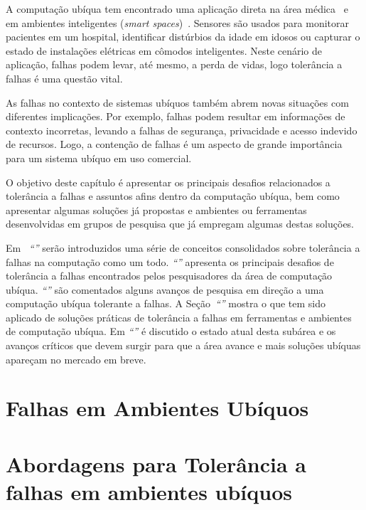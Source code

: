 \documentclass{SBCbookchapter}
\begin{document}
A computação ubíqua tem encontrado uma aplicação direta na área médica~\cite{Bang03} e em ambientes inteligentes (\emph{smart spaces})~\cite{Kidd99}. Sensores são usados para monitorar pacientes em um hospital, identificar distúrbios da idade em idosos ou capturar o estado de instalações elétricas em cômodos inteligentes. Neste cenário de aplicação, falhas podem levar, até mesmo, a perda de vidas, logo tolerância a falhas é uma questão vital.

As falhas no contexto de sistemas ubíquos também abrem novas situações com diferentes implicações. Por exemplo, falhas podem resultar em informações de contexto incorretas, levando a falhas de segurança, privacidade e acesso indevido de recursos. Logo, a contenção de falhas é um aspecto de grande importância para um sistema ubíquo em uso comercial.

O objetivo deste capítulo é apresentar os principais desafios relacionados a tolerância a falhas e assuntos afins dentro da computação ubíqua, bem como apresentar algumas soluções já propostas e ambientes ou ferramentas desenvolvidas em grupos de pesquisa que já empregam algumas destas soluções.

Em ~\emph{``''} serão introduzidos uma série de conceitos consolidados sobre tolerância a falhas na computação como um todo. \emph{``''} apresenta os principais desafios de tolerância a falhas encontrados pelos pesquisadores da área de computação ubíqua. \emph{``''} são comentados alguns avanços de pesquisa em direção a uma computação ubíqua tolerante a falhas. A Seção~\emph{``''} mostra o que tem sido aplicado de soluções práticas de tolerância a falhas em ferramentas e ambientes de computação ubíqua. Em \emph{``''} é discutido o estado atual desta subárea e os avanços críticos que devem surgir para que a área avance e mais soluções ubíquas apareçam no mercado em breve.


\section{Falhas em Ambientes Ubíquos}
\label{sec:falhas_ubicomp}


\section{Abordagens para Tolerância a falhas em ambientes ubíquos}
\label{sec:tolerancia}

\end{document}
